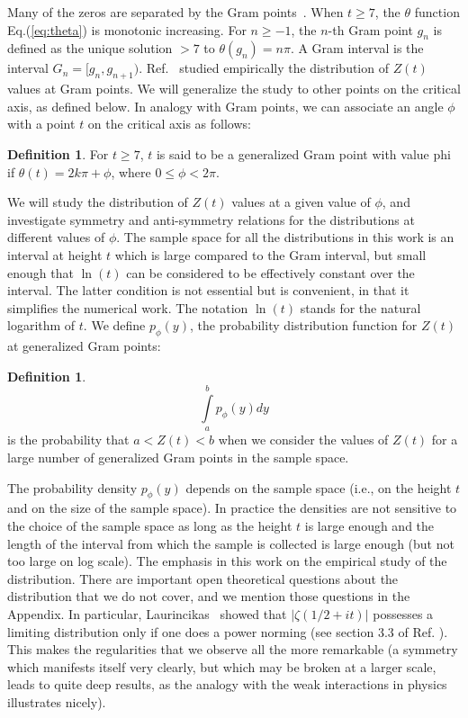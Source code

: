 \documentclass{amsart}
\theoremstyle{definition}
\newtheorem{definition}[theorem]{Definition}
\theoremstyle{remark}
\numberwithin{equation}{section}
\begin{document}
Many of the zeros are separated by the
Gram points~\cite{Gram 1903}.  When $t \ge 7$, the $\theta$ function Eq.(\ref{eq:theta}) is monotonic increasing. 
For $n \ge -1$, the $n$-th Gram point $g_n$ is defined as the unique solution $> 7$ to
$\theta (g_n) = n\pi$. A Gram interval is the interval $G_n = [g_n,g_{n+1})$.
Ref.~\cite{Shanker 2018} studied empirically the distribution of $Z(t)$ values at Gram points. We will generalize the study to other points on
the critical axis, as defined below. In analogy with Gram points, we can associate an angle $\phi$ with a point $t$ on the critical axis as follows:
\begin{definition}\label{phi}
For $t \ge 7$, $t$ is said to be a generalized Gram point with value phi if
$\theta (t) = 2k\pi + \phi$, where $0 \le \phi < 2\pi$.
\end{definition}
We will study the distribution of $Z(t)$ values at a given value of $\phi$, and investigate symmetry and anti-symmetry relations for the 
distributions at different values of $\phi$. The sample space for all the distributions in this work is an interval  at height $t$ which is large compared to the Gram interval, but small enough that $\ln (t)$ can be considered to be effectively constant over  the interval. 
The latter condition is not essential but is convenient, in that it simplifies the numerical work. The notation $\ln (t)$ stands for the natural logarithm of $t$.  We define $p_{\phi}(y)$, the probability distribution function for $Z(t)$ at generalized Gram  points:
\begin{definition}\label{pphi}
\begin{equation}
\int\limits_{a}^{b} p_{\phi}(y)dy
\label{eq:pdfphi}
\end{equation}
is the probability that $a<Z(t)<b$ when we consider the values of $Z(t)$ for a large number of generalized Gram points in the sample space. 
\end{definition}
The probability density  $p_{\phi}(y)$ depends on the sample space (i.e., on the height $t$ and on the size of the sample space). In practice the densities are not sensitive to the choice of the sample space as long as the height $t$ is large enough and the length of the interval from which the sample is collected is large enough (but not too large on log scale). The emphasis in this work on the empirical study of the distribution. There are important open theoretical questions about the distribution that we do not cover, and we mention those questions in the Appendix.
 In particular, Laurincikas~\cite{Laurincikas} showed  that $|\zeta(1/2+it)|$
 possesses a limiting distribution only if one does a power norming (see section 3.3 of Ref. \cite{Laurincikas}). This makes the regularities that we observe all the more remarkable (a symmetry which manifests
 itself very clearly, but which may be broken at a larger scale, leads to quite deep results, as the analogy with the weak interactions in physics 
 illustrates nicely).
\end{document}
